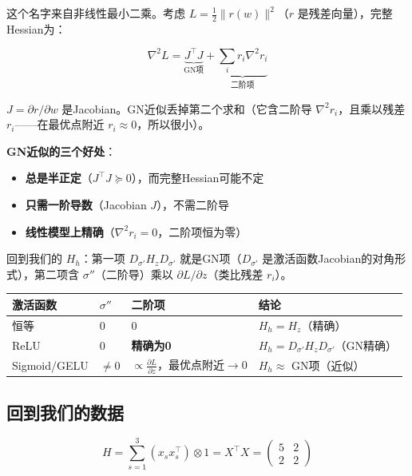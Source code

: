 \documentclass[12pt,a4paper]{article}
\begin{document}
这个名字来自非线性最小二乘。考虑 $L = \frac{1}{2}\|r(w)\|^2$（$r$ 是残差向量），完整Hessian为：

\[\nabla^2 L = \underbrace{J^\top J}_{\text{GN项}} + \underbrace{\sum_i r_i \nabla^2 r_i}_{\text{二阶项}}\]

$J = \partial r / \partial w$ 是Jacobian。GN近似丢掉第二个求和（它含二阶导 $\nabla^2 r_i$，且乘以残差 $r_i$——在最优点附近 $r_i \approx 0$，所以很小）。

\textbf{GN近似的三个好处}：
\begin{itemize}[leftmargin=*,nosep]
\item \textbf{总是半正定}（$J^\top J \succeq 0$），而完整Hessian可能不定
\item \textbf{只需一阶导数}（Jacobian $J$），不需二阶导
\item \textbf{线性模型上精确}（$\nabla^2 r_i = 0$，二阶项恒为零）
\end{itemize}

回到我们的 $H_h$：第一项 $D_{\sigma'} H_z D_{\sigma'}$ 就是GN项（$D_{\sigma'}$ 是激活函数Jacobian的对角形式），第二项含 $\sigma''$（二阶导）乘以 $\partial L/\partial z$（类比残差 $r_i$）。







\begin{center}\small
\begin{longtable}{|l|l|l|l|}
\hline
激活函数 & $\sigma''$ & 二阶项 & 结论 \\
\hline
恒等 & $0$ & $0$ & $H_h = H_z$（精确） \\
ReLU & $0$ & \textbf{精确为0} & $H_h = D_{\sigma'} H_z D_{\sigma'}$（GN精确） \\
Sigmoid/GELU & $\neq 0$ & $\propto \frac{\partial L}{\partial z}$，最优点附近$\to$0 & $H_h \approx$ GN项（近似） \\
\hline
\end{longtable}
\end{center}



\subsection{回到我们的数据}


\[H = \sum_{s=1}^3 (x_s x_s^\top) \otimes 1 = X^\top X = \begin{pmatrix}5&2\\2&2\end{pmatrix}\]
\end{document}
